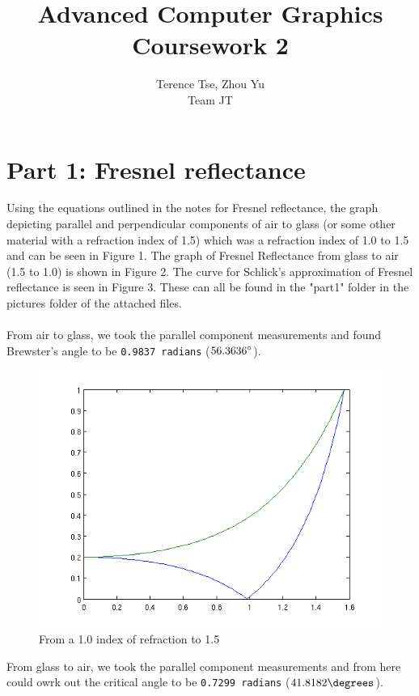 \documentclass{article}
\begin{document}
\title{Advanced Computer Graphics\\ Coursework 2}
\author{Terence Tse, Zhou Yu \\ Team JT}
\maketitle
\newpage

\section{Part 1: Fresnel reflectance}
Using the equations outlined in the notes for Fresnel reflectance,
the graph depicting parallel and perpendicular components of air to glass
(or some other material with a refraction index of 1.5)
which was a refraction index of 1.0 to 1.5 and can be seen in Figure 1. The
graph of Fresnel Reflectance from glass to air (1.5 to 1.0) is shown in 
Figure 2. The curve for Schlick's approximation of Fresnel
reflectance is seen in Figure 3. These can all be found in the "part1" folder
in the pictures folder of the attached files.\\
\\
From air to glass, we took the parallel component measurements and found
Brewster's angle to be \texttt{0.9837 radians} ($56.3636\degree$).

\begin{figure}[h]
	\centering
	\includegraphics[scale=0.5]{pics/part1/air2glass.png}
	\caption{From a 1.0 index of refraction to 1.5}
\end{figure}

From glass to air, we took the parallel component measurements and from here
could owrk out the critical angle to be \texttt{0.7299 radians} 
($41.8182\degrees$).
\end{document}
